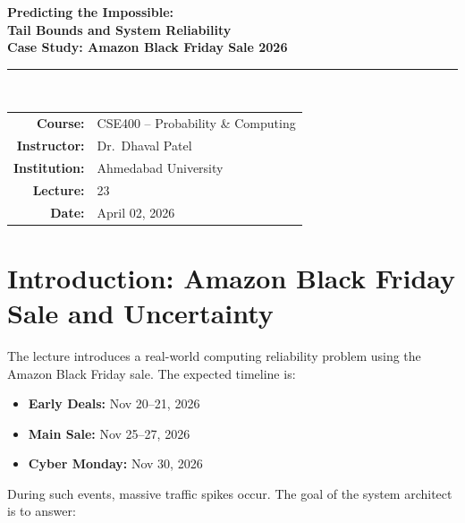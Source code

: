 \documentclass[12pt, a4paper]{article}
\begin{document}
\begin{center}
  {\LARGE\bfseries\color{accentblue}
    Predicting the Impossible:\\[4pt]
    Tail Bounds and System Reliability}\\[10pt]
  {\large\bfseries Case Study: Amazon Black Friday Sale 2026}\\[8pt]
  \rule{0.6\linewidth}{0.8pt}\\[6pt]
  \begin{tabular}{rl}
    \textbf{Course:}      & CSE400 -- Probability \& Computing \\
    \textbf{Instructor:}  & Dr.\ Dhaval Patel                  \\
    \textbf{Institution:} & Ahmedabad University               \\
    \textbf{Lecture:}     & 23                                 \\
    \textbf{Date:}        & April 02, 2026                     \\
  \end{tabular}
\end{center}

\vspace{8pt}

\tableofcontents
\newpage

\section{Introduction: Amazon Black Friday Sale and Uncertainty}

The lecture introduces a real-world computing reliability problem using the Amazon Black Friday
sale. The expected timeline is:

\begin{itemize}[leftmargin=2em]
  \item \textbf{Early Deals:} Nov 20--21, 2026
  \item \textbf{Main Sale:} Nov 25--27, 2026
  \item \textbf{Cyber Monday:} Nov 30, 2026
\end{itemize}

During such events, massive traffic spikes occur. The goal of the system architect is to answer:
\end{document}
